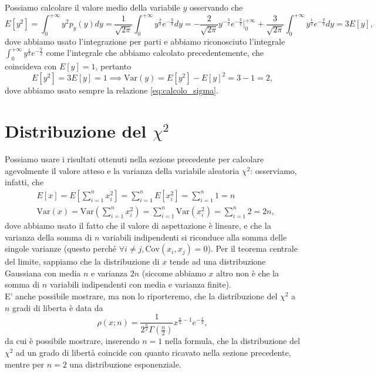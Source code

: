 \documentclass{report}
\begin{document}
Possiamo calcolare il valore medio della variabile $y$ osservando che
$$
E[y^2] = \int_0^{+\infty} y^2 p_y(y) dy = \frac{1}{\sqrt{2 \pi}} \int_0^{+\infty} y^{\frac{3}{2}} e^{-\frac{y}{2}}dy = - \frac{2}{\sqrt{2 \pi}} y^{-\frac{3}{2}} e^{-\frac{y}{2}}\bigg|^{+\infty}_0 + \frac{3}{\sqrt{2\pi}} \int_0^{+\infty} y^{\frac{1}{2}} e^{-\frac{y}{2}}dy = 3E[y],
$$
dove abbiamo usato l'integrazione per parti e abbiamo riconosciuto l'integrale $\int_0^{+\infty} y^{\frac{1}{2}}e^{-\frac{y}{2}}$ come l'integrale che abbiamo calcolato precedentemente, che coincideva con $E[y] = 1$, pertanto
$$
	E[y^2] = 3E[y] = 1 \implies \text{Var}(y) = E[y^2] - E[y]^2 = 3 - 1 = 2,
$$
dove abbiamo usato sempre la relazione \ref{eq:calcolo_sigma}.
\section{Distribuzione del $\chi^2$}
Possiamo usare i risultati ottenuti nella sezione precedente per calcolare agevolmente il valore atteso e la varianza della variabile aleatoria $\chi^2$: osserviamo, infatti, che
\begin{align*}
&E[x] = E \left[ \sum_{i=1}^n x_i^2 \right] = \sum_{i=1}^n E[x_i^2] = \sum_{i=1}^n 1 = n \\
&\text{Var}(x) = \text{Var}\left(\sum_{i=1}^n x_i^2 \right) = \sum_{i=1}^n \text{Var}(x_i^2) = \sum_{i=1}^n 2 = 2n,
\end{align*}
dove abbiamo usato il fatto che il valore di aspettazione è lineare, e che la varianza della somma di $n$ variabili indipendenti si riconduce alla somma delle singole varianze (questo perché $\forall i \neq j, \text{Cov}(x_i, x_j) = 0$). Per il teorema centrale del limite, sappiamo che la distribuzione di $x$ tende ad una distribuzione Gaussiana con media $n$ e varianza $2n$ (siccome abbiamo $x$ altro non è che la somma di $n$ variabili indipendenti con media e varianza finite). \\
E' anche possibile mostrare, ma non lo riporteremo, che la distribuzione del $\chi^2$ a $n$ gradi di liberta è data da
$$
\mathcal{\rho}(x; n) = \frac{1}{2^{\frac{n}{2}} \Gamma(\frac{n}{2})} x^{\frac{n}{2} - 1}e^{-\frac{x}{2}},
$$
da cui è possibile mostrare, inserendo $n=1$ nella formula, che la distribuzione del $\chi^2$ ad un grado di libertà coincide con quanto ricavato nella sezione precedente, mentre per $n=2$ una distribuzione esponenziale.
\end{document}
